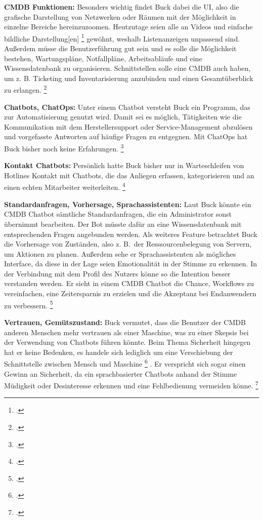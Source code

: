 \textbf{CMDB Funktionen: }Besonders wichtig findet Buck dabei die UI, also die grafische Darstellung von Netzwerken oder Räumen mit der Möglichkeit in einzelne Bereiche hereinzuzoomen. Heutzutage seien alle an Videos und \glqq{}einfache bildliche Darstellung[en]\grqq
\footcite[][o. \pno]{Buck_2019}
 gewöhnt, weshalb Listenanzeigen unpassend sind. Außerdem müsse die Benutzerführung gut sein und es solle die Möglichkeit bestehen, Wartungspläne, Notfallpläne, Arbeitsabläufe und eine Wissensdatenbank zu organisieren. Schnittstellen solle eine \acs{CMDB} auch haben, um z. B. Ticketing und Inventarisierung anzubinden und einen Gesamtüberblick zu erlangen. 
\footcite[Vgl.][o. \pno]{Buck_2019}

\textbf{Chatbots, ChatOps: }Unter einem Chatbot versteht Buck ein Programm, das zur Automatisierung genutzt wird. Damit sei es möglich, Tätigkeiten wie die Kommunikation mit dem Herstellersupport oder Service-Management abzulösen und vorgefasste Antworten auf häufige Fragen zu entgegnen. Mit ChatOps hat Buck bisher noch keine Erfahrungen.
\footcite[Vgl.][o. \pno]{Buck_2019}

\textbf{Kontakt Chatbots: }Persönlich hatte Buck bisher nur in Warteschleifen von Hotlines Kontakt mit Chatbots, die das Anliegen erfassen, kategorisieren und an einen echten Mitarbeiter weiterleiten.
\footcite[Vgl.][o. \pno]{Buck_2019}

\textbf{Standardanfragen, Vorhersage, Sprachassistenten: }Laut Buck könnte ein \acs{CMDB} Chatbot sämtliche Standardanfragen, die ein Administrator sonst übernimmt bearbeiten. Der Bot müsste dafür an eine Wissensdatenbank mit entsprechenden Fragen angebunden werden.
Als weiteres Feature betrachtet Buck die Vorhersage von Zuständen, also z. B.~der Resssourcenbelegung von Servern, um Aktionen zu planen. Außerdem sehe er Sprachassistenten als mögliches Interface, da diese in der Lage seien Emotionalität in der Stimme zu erkennen. In der Verbindung mit dem Profil des Nutzers könne so die Intention besser verstanden werden. Er sieht in einem \acs{CMDB} Chatbot die Chance, Workflows zu vereinfachen, eine Zeitersparnis zu erzielen und die Akzeptanz bei Endanwendern zu verbessern. 
\footcite[Vgl.][o. \pno]{Buck_2019}

\textbf{Vertrauen, Gemütszustand: }Buck vermutet, dass die Benutzer der \acs{CMDB} anderen Menschen mehr vertrauen als einer Maschine, was zu einer Skepsis bei der Verwendung von Chatbots führen könnte. Beim Thema Sicherheit hingegen hat er keine Bedenken, es handele sich lediglich um eine Verschiebung \glqq{}der Schnittstelle zwischen Mensch und Maschine\grqq
\footcite[][o. \pno]{Buck_2019}
. Er verspricht sich sogar einen Gewinn an Sicherheit, da ein sprachbasierter Chatbots anhand der Stimme Müdigkeit oder Desinteresse erkennen und eine Fehlbedienung vermeiden könne. 
\footcite[Vgl.][o. \pno]{Buck_2019}

